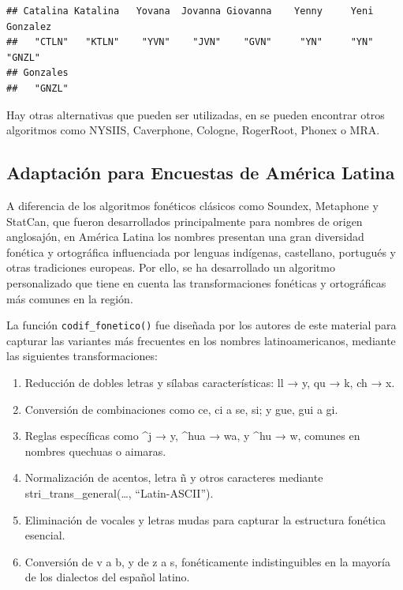 \documentclass[
  12pt,
]{book}
\providecommand{\tightlist}{%
  \setlength{\itemsep}{0pt}\setlength{\parskip}{0pt}}
\begin{document}
\begin{verbatim}
## Catalina Katalina   Yovana  Jovanna Giovanna    Yenny     Yeni Gonzalez 
##   "CTLN"   "KTLN"    "YVN"    "JVN"    "GVN"     "YN"     "YN"   "GNZL" 
## Gonzales 
##   "GNZL"
\end{verbatim}

Hay otras alternativas que pueden ser utilizadas, en \citet{howard2020phonetic} se pueden encontrar otros algoritmos como NYSIIS, Caverphone, Cologne, RogerRoot, Phonex o MRA.

\subsection{Adaptación para Encuestas de América Latina}\label{adaptaciuxf3n-para-encuestas-de-amuxe9rica-latina}

A diferencia de los algoritmos fonéticos clásicos como Soundex, Metaphone y StatCan, que fueron desarrollados principalmente para nombres de origen anglosajón, en América Latina los nombres presentan una gran diversidad fonética y ortográfica influenciada por lenguas indígenas, castellano, portugués y otras tradiciones europeas. Por ello, se ha desarrollado un algoritmo personalizado que tiene en cuenta las transformaciones fonéticas y ortográficas más comunes en la región.

La función \texttt{codif\_fonetico()} fue diseñada por los autores de este material para capturar las variantes más frecuentes en los nombres latinoamericanos, mediante las siguientes transformaciones:

\begin{enumerate}
\def\labelenumi{\arabic{enumi}.}
\tightlist
\item
  Reducción de dobles letras y sílabas características: ll → y, qu → k, ch → x.
\item
  Conversión de combinaciones como ce, ci a se, si; y gue, gui a gi.
\item
  Reglas específicas como \^{}j → y, \^{}hua → wa, y \^{}hu → w, comunes en nombres quechuas o aimaras.
\item
  Normalización de acentos, letra ñ y otros caracteres mediante stri\_trans\_general(\ldots, ``Latin-ASCII'').
\item
  Eliminación de vocales y letras mudas para capturar la estructura fonética esencial.
\item
  Conversión de v a b, y de z a s, fonéticamente indistinguibles en la mayoría de los dialectos del español latino.
\end{enumerate}
\end{document}
